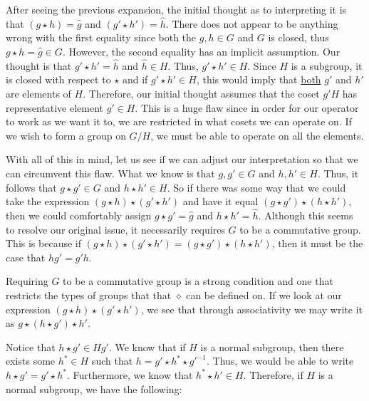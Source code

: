 \documentclass[12pt, a4paper]{article}
\begin{document}
    After seeing the previous expansion, the initial thought as to interpreting it is that $(g\star h)=\hat{g}$ and $(g'\star h')=\hat{h}$. There does not appear to be anything wrong with the first equality since both the $g,h\in G$ and $G$ is closed, thus $g\star h=\hat{g}\in G$. However, the second equality has an implicit assumption. Our thought is that $g'\star h'=\hat{h}$ and $\hat{h}\in H$. Thus, $g'\star h'\in H$. Since $H$ is a subgroup, it is closed with respect to $\star$ and if $g'\star h'\in H$, this would imply that \underline{both} $g'$ and $h'$ are elements of $H$. Therefore, our initial thought assumes that the coset $g'H$ has representative element $g'\in H$. This is a huge flaw since in order for our operator to work as we want it to, we are restricted in what cosets we can operate on. If we wish to form a group on $G/H$, we must be able to operate on all the elements.\par
    
    With all of this in mind, let us see if we can adjust our interpretation so that we can circumvent this flaw. What we know is that $g,g'\in G$ and $h,h'\in H$. Thus, it follows that $g\star g'\in G$ and $h\star h'\in H$. So if there was some way that we could take the expression $(g\star h)\star(g'\star h')$ and have it equal $(g\star g')\star(h\star h')$, then we could comfortably assign $g\star g'=\hat{g}$ and $h\star h'=\hat{h}$. Although this seems to resolve our original issue, it necessarily requires $G$ to be a commutative group. This is because if $(g\star h)\star(g'\star h')=(g\star g')\star(h\star h')$, then it must be the case that $hg'=g'h$.\par
    
    Requiring $G$ to be a commutative group is a strong condition and one that restricts the types of groups that that $\diamond$ can be defined on. If we look at our expression $(g\star h)\star(g'\star h')$, we see that through associativity we may write it as $g\star(h\star g')\star h'$.
    
\newpage
    
    Notice that $h\star g'\in Hg'$. We know that if $H$ is a normal subgroup, then there exists some $h^{\ast}\in H$ such that $h=g'\star h^{\ast}\star g'^{-1}$. Thus, we would be able to write $h\star g'=g'\star h^{\ast}$. Furthermore, we know that $h^{\ast}\star h'\in H$. Therefore, if $H$ is a normal subgroup, we have the following:\par
    
\vspace{4mm}
        
\end{document}

